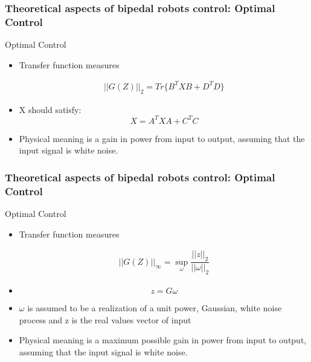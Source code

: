 \documentclass{beamer}
\begin{document}

\begin{frame}
	\frametitle{Theoretical aspects of bipedal robots control: Optimal Control}
	\begin{block}{Optimal Control}
		\begin{itemize}
			\item
				Transfer function measures
				
				\begin{equation}
					\begin{split}
						||G(Z)||_2 = Tr\{ B^{T} XB + D^{T} D \}
					\end{split}
				\end{equation}
			\item
				X should satisfy:
				\begin{equation}
					X = A^TXA + C^TC
				\end{equation}
			\item
				Physical meaning is a gain in power from input to output, assuming that the input signal is white noise.
		\end{itemize}
	\end{block}
\end{frame}


	\begin{frame}
		\frametitle{Theoretical aspects of bipedal robots control: Optimal Control}
		\begin{block}{Optimal Control}
			\begin{itemize}
				\item
					Transfer function measures
					
					\begin{equation}
						\begin{split}
							||G(Z)||_\infty = \sup_{\omega} \dfrac{||z||_2}{||\omega||_2}
						\end{split}
					\end{equation}
				\item
					\begin{equation}
					z  =G \omega
					\end{equation}
				\item
					$\omega$ is assumed to be a realization of a unit power, Gaussian, white noise
					process and z is the real values vector of input
				\item
					Physical meaning is a maximum possible gain in power from input to output, assuming that the input signal is white noise.
			\end{itemize}
		\end{block}
	\end{frame}
\end{document}
